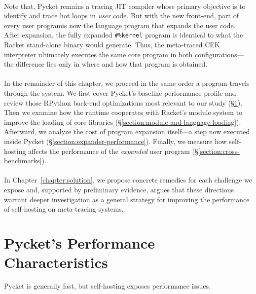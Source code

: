 	\paragraph{}%
		Note that, Pycket remains a tracing JIT compiler whose primary objective is to identify and trace hot loops in \emph{user} code. But with the new front-end, part of every \smartQL user program\smartQR is now the language program that expands the user code. After expansion, the fully expanded \verb|#%kernel| program is identical to what the Racket stand-alone binary would generate. Thus, the meta-traced CEK interpreter ultimately executes the same core program in both configurations—the difference lies only in where and how that program is obtained.

	\paragraph{}%
		In the remainder of this chapter, we proceed in the same order a program travels through the system. We first cover Pycket's baseline performance profile and review those RPython back-end optimizations most relevant to our study (\S\ref{section:pycket-performance-characteristics}). Then we examine how the runtime cooperates with Racket's module system to improve the loading of core libraries (\S\ref{section:module-and-language-loading}). Afterward, we analyze the cost of program expansion itself—a step now executed inside Pycket (\S\ref{section:expander-performance}). Finally, we measure how self-hosting affects the performance of the \emph{expanded} user program (\S\ref{section:cross-benchmarks}).

	\paragraph{}%
		In Chapter~\ref{chapter:solution}, we propose concrete remedies for each challenge we expose and, supported by preliminary evidence, argues that these directions warrant deeper investigation as a general strategy for improving the performance of self-hosting on meta-tracing systems.

	\section{Pycket's Performance Characteristics}
	\label{section:pycket-performance-characteristics}

	\begin{sectionpoint}
		Pycket is generally fast, but self-hosting exposes performance issues.
	\end{sectionpoint}

